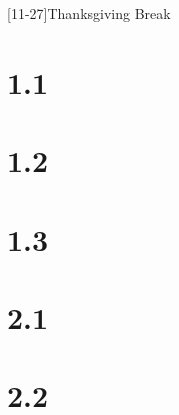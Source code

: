 \documentclass{schedule}
\begin{document}
\maketitle
\begin{schedule}
	[11-27]{Thanksgiving Break}

	\syllabus
	\section{1.1}
	\section{1.2}
	\section[2]{1.3}
	\examreview
	\exam[noquiz]

	\section{2.1}
	\section{2.2}
	\finalreview
	\finalsweek[12-14][5]
	\winterbreak
\end{schedule}
\end{document}
